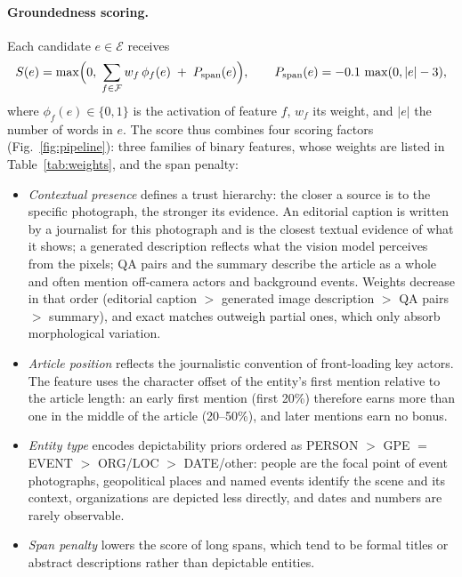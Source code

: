 \documentclass[runningheads]{llncs}
\DeclareRobustCommand{\aciids}[1]{{\color{olive}#1}}
\DeclareRobustCommand{\revise}[1]{{\color{olive}#1}}
\DeclareRobustCommand{\aciids}[1]{#1}
\DeclareRobustCommand{\revise}[1]{#1}
\begin{document}
\paragraph{Groundedness scoring.}
Each candidate $e\in\mathcal{E}$ receives
\begin{equation}
S(e)=\max\Bigl(0,\;\sum_{f\in\mathcal{F}} w_f\,\phi_f(e)\;+\;P_{\mathrm{span}}(e)\Bigr),
\qquad
P_{\mathrm{span}}(e)=-0.1\,\max(0,|e|-3),
\label{eq:entity_score}
\end{equation}
where $\phi_f(e)\in\{0,1\}$ is the activation of feature $f$, $w_f$ its weight, and $|e|$ the number of words in $e$. \aciids{The score thus combines four scoring factors (Fig.~\ref{fig:pipeline}): three families of binary features, whose weights are listed in Table~\ref{tab:weights}, and the span penalty:}
\begin{itemize}
  \item \textit{Contextual presence} defines a trust hierarchy: the closer a source is to the specific photograph, the stronger its evidence. \revise{An editorial caption is written by a journalist for this photograph and is the closest textual evidence of what it shows; a generated description reflects what the vision model perceives from the pixels; QA pairs and the summary describe the article as a whole and often mention off-camera actors and background events.} Weights decrease in that order \aciids{(editorial caption $>$ generated image description $>$ QA pairs $>$ summary)}, and exact matches outweigh partial ones, which only absorb morphological variation.
  \item \textit{Article position} reflects the journalistic convention of front-loading key actors. \revise{The feature uses the character offset of the entity's first mention relative to the article length:} \aciids{an early first mention \revise{(first 20\%)} therefore earns more than one in the middle of the article \revise{(20--50\%)}, and later mentions earn no bonus.}
  \item \textit{Entity type} encodes depictability priors \aciids{ordered as PERSON $>$ GPE \revise{$=$} EVENT $>$ ORG/LOC $>$ DATE/other}: people are the focal point of event photographs, \revise{geopolitical places and named events identify the scene and its context}, organizations are depicted less directly, and dates and numbers are rarely observable.
  \item \aciids{\textit{Span penalty} lowers the score of long spans, which tend to be formal titles or abstract descriptions rather than depictable entities.}
\end{itemize}
\end{document}
